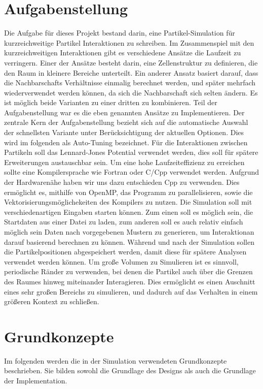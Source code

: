 \documentclass[
	12pt,
	a4paper,
	BCOR10mm,
	DIV14,
	headsepline,
]{scrreprt}
\begin{document}
\chapter{Aufgabenstellung}
\label{Aufgabenstellung}
Die Aufgabe für dieses Projekt bestand darin, eine Partikel-Simulation für kurzreichweitige Partikel Interaktionen zu schreiben. Im Zusammenspiel mit den kurzreichweitigen Interaktionen gibt es verschiedene Ansätze die Laufzeit zu verringern. Einer der Ansätze besteht darin, eine Zellenstruktur zu definieren, die den Raum in kleinere Bereiche unterteilt. Ein anderer Ansatz basiert darauf, dass die Nachbarschafts Verhältnisse einmalig berechnet werden, und später mehrfach wiederverwendet werden können, da sich die Nachbarschaft sich selten ändern. Es ist möglich beide Varianten zu einer dritten zu kombinieren. Teil der Aufgabenstellung war es die eben genannten Ansätze zu Implementieren. Der zentrale Kern der Aufgabenstellung bezieht sich auf die automatische Auswahl der schnellsten Variante unter Berücksichtigung der aktuellen Optionen. Dies wird im folgenden als Auto-Tuning bezeichnet. Für die Interaktionen zwischen Partikeln soll das Lennard-Jones Potential verwendet werden, dies soll für spätere Erweiterungen austauschbar sein. Um eine hohe Laufzeiteffizienz zu erreichen sollte eine Kompilersprache wie Fortran oder C/Cpp verwendet werden. Aufgrund der Hardwarenähe haben wir uns dazu entschieden Cpp zu verwenden. Dies ermöglicht es, mithilfe von OpenMP, das Programm zu parallelisieren, sowie die Vektorisierungsmöglichekeiten des Kompilers zu nutzen. Die Simulation soll mit verschiedenartigen Eingaben starten können. Zum einen soll es möglich sein, die Startdaten aus einer Datei zu laden, zum anderen soll es auch relativ einfach möglich sein Daten nach vorgegebenen Mustern zu generieren, um Interaktionan darauf basierend berechnen zu können. Während und nach der Simulation sollen die Partikelpositionen abgespeichert werden, damit diese für spätere Analysen verwendet werden können. Um große Volumen zu Simulieren ist es sinnvoll, periodische Ränder zu verwenden, bei denen die Partikel auch über die Grenzen des Raumes hinweg miteinander Interagieren. Dies ermöglicht es einen Auschnitt eines sehr großen Bereichs zu simulieren, und dadurch auf das Verhalten in einem größeren Kontext zu schließen.
\chapter{Grundkonzepte}
\label{Grundkonzepte}
Im folgenden werden die in der Simulation verwendeten Grundkonzepte beschrieben. Sie bilden sowohl die Grundlage des Designs als auch die Grundlage der Implementation.
\end{document}

